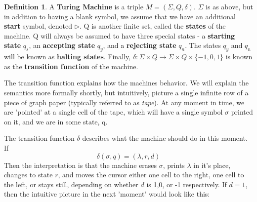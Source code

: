 \documentclass{article}
\theoremstyle{definition}
\newtheorem{definition}{Definition}[section]
\theoremstyle{plain}
\theoremstyle{theorem}
\begin{document}
\begin{definition}
A \textbf{Turing Machine} is a triple $M=(\Sigma,Q,\delta)$. $\Sigma$ is as above, but in addition to having a blank symbol, we assume that we have an additional \textbf{start} symbol, denoted $\triangleright$. Q is another finite set, called the \textbf{states} of the machine. Q will always be assumed to have three special states - a \textbf{starting state} $q_s$, an \textbf{accepting state} $q_y$, and a \textbf{rejecting state} $q_n$. The states $q_y$ and $q_n$ will be known as \textbf{halting states}. Finally, $\delta: \Sigma \times Q \to \Sigma \times Q \times \{-1,0,1\}$ is known as the \textbf{transition function} of the machine. 
\end{definition}
The transition function explains how the machines behavior. We will explain the semantics more formally shortly, but intuitively, picture a single infinite row of a piece of graph paper (typically referred to as \textit{tape}). At any moment in time, we are 'pointed' at a single cell of the tape, which will have a single symbol $\sigma$ printed on it, and we are in some state, q. 
\vspace{1cm}
\begin{center}
\end{center}
\par The transition function $\delta$ describes what the machine should do in this moment. If 
\[\delta(\sigma,q)=(\lambda,r,d)\]
Then the interpretation is that the machine erases $\sigma$, prints $\lambda$ in it's place, changes to state $r$, and moves the cursor either one cell to the right, one cell to the left, or stays still, depending on whether $d$ is 1,0, or -1 respectively. If $d=1$, then the intuitive picture in the next 'moment' would look like this:
\end{document}
